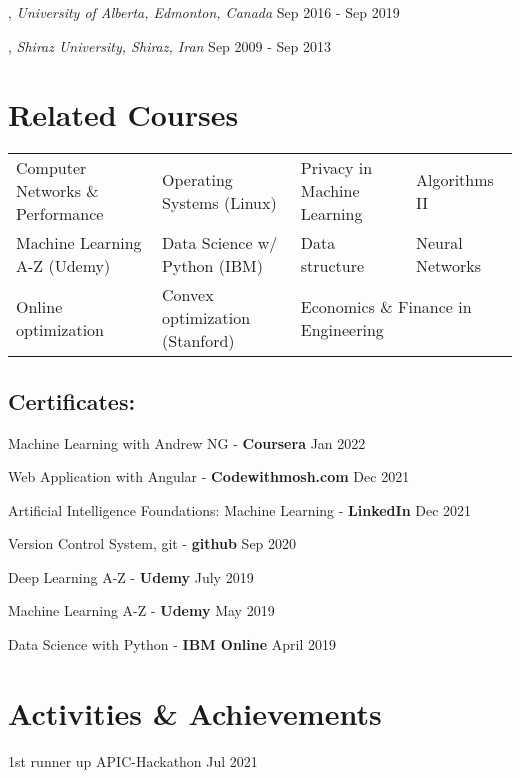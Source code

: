 \documentclass[letter,11pt]{article}
\begin{document}
, \textit{University of Alberta, Edmonton, Canada}	\hfill Sep 2016 -  Sep 2019

, \textit{Shiraz University, Shiraz, Iran} \hfill	Sep 2009 - Sep 2013






\section{Related Courses}
\begin{tabular}{p{5.9cm}p{5.3cm}p{5cm}p{5cm}}
	Computer Networks \& Performance & Operating Systems (Linux) & Privacy in Machine Learning & Algorithms II\\
	Machine Learning A-Z (Udemy) & Data Science w/ Python (IBM) & Data structure & Neural Networks \\
	Online optimization & Convex optimization (Stanford) & \multicolumn{2}{l}{Economics \& Finance in Engineering}\\
\end{tabular}
\subsection{Certificates:}
\begin{zitemize}
	\item Machine Learning with Andrew NG - \textbf{Coursera} \hfill Jan 2022
	\item Web Application with Angular - \textbf{Codewithmosh.com} \hfill Dec 2021
	\item Artificial Intelligence Foundations: Machine Learning - \textbf{LinkedIn} \hfill Dec 2021
	\item Version Control System, git - \textbf{github} \hfill Sep 2020
	\item Deep Learning A-Z - \textbf{Udemy} \hfill July 2019
	\item Machine Learning A-Z - \textbf{Udemy} \hfill May 2019
	\item Data Science with Python - \textbf{IBM Online} \hfill April 2019
\end{zitemize}



\section{Activities \& Achievements}
 	1st runner up APIC-Hackathon	\hfill Jul 2021
\end{document}
